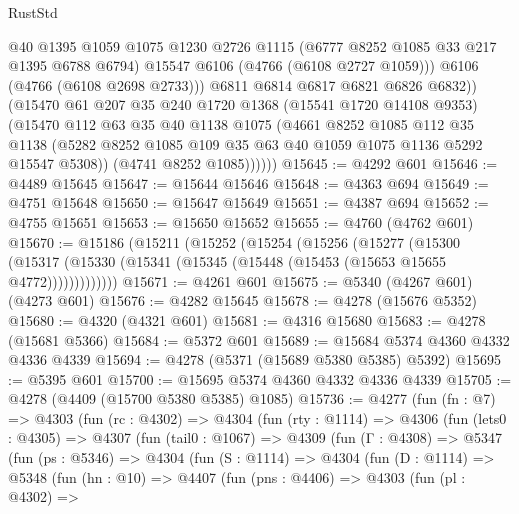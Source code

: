 \begin{lexlean}{RustStd}
\begin{coremodule}
{\begin{coremodule}
{{{{{{{{{{{{{{{{{{{{{{{{{{{{{{{{{{{                  @40
                  @1395
                  @1059
                  @1075
                  @1230
                  @2726
                  @1115
                  (@6777 @8252 @1085 @33 @217 @1395 @6788 @6794)
                  @15547
                  @6106
                  (@4766 (@6108 @2727 @1059)))
                @6106
                (@4766 (@6108 @2698 @2733)))
              @6811
              @6814
              @6817
              @6821
              @6826
              @6832))
          (@15470
            @61
            @207
            @35
            @240
            @1720
            @1368
            (@15541 @1720 @14108 @9353)
            (@15470
              @112
              @63
              @35
              @40
              @1138
              @1075
              (@4661
                @8252
                @1085
                @112
                @35
                @1138
                (@5282 @8252 @1085 @109 @35 @63 @40 @1059 @1075 @1136 @5292 @15547 @5308))
              (@4741 @8252 @1085))))))
@15645 := @4292 @601
@15646 := @4489 @15645
@15647 := @15644 @15646
@15648 := @4363 @694
@15649 := @4751 @15648
@15650 := @15647 @15649
@15651 := @4387 @694
@15652 := @4755 @15651
@15653 := @15650 @15652
@15655 := @4760 (@4762 @601)
@15670 := @15186
    (@15211
      (@15252
        (@15254
          (@15256
            (@15277
              (@15300
                (@15317 (@15330 (@15341 (@15345 (@15448 (@15453 (@15653 @15655 @4772)))))))))))))
@15671 := @4261 @601
@15675 := @5340 (@4267 @601) (@4273 @601)
@15676 := @4282 @15645
@15678 := @4278 (@15676 @5352)
@15680 := @4320 (@4321 @601)
@15681 := @4316 @15680
@15683 := @4278 (@15681 @5366)
@15684 := @5372 @601
@15689 := @15684 @5374 @4360 @4332 @4336 @4339
@15694 := @4278 (@5371 (@15689 @5380 @5385) @5392)
@15695 := @5395 @601
@15700 := @15695 @5374 @4360 @4332 @4336 @4339
@15705 := @4278 (@4409 (@15700 @5380 @5385) @1085)
@15736 := @4277
    (fun (fn : @7) =>
    @4303
      (fun (rc : @4302) =>
      @4304
        (fun (rty : @1114) =>
        @4306
          (fun (lets0 : @4305) =>
          @4307
            (fun (tail0 : @1067) =>
            @4309
              (fun (Γ : @4308) =>
              @5347
                (fun (ps : @5346) =>
                @4304
                  (fun (S : @1114) =>
                  @4304
                    (fun (D : @1114) =>
                    @5348
                      (fun (hn : @10) =>
                      @4407
                        (fun (pns : @4406) =>
                        @4303
                          (fun (pl : @4302) =>
}}}}}}}}}}}}}}}}}}}}}}}}}}}}}}}}}}}
\end{coremodule}}
\end{coremodule}
\end{lexlean}
